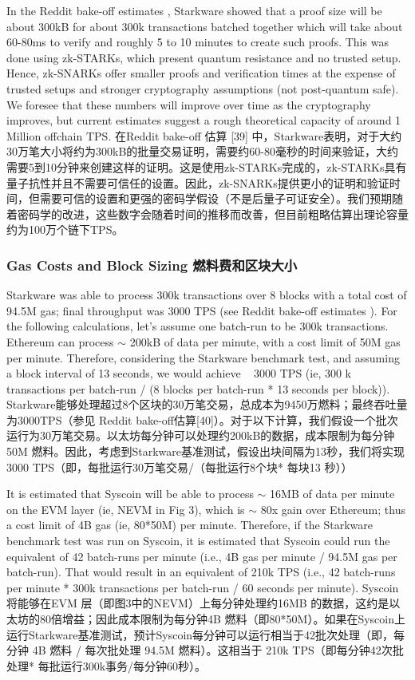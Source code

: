 \documentclass{ctexart}
\begin{document}
In the Reddit bake-off estimates \cite{Sta20a}, Starkware showed that a proof size will be about 300kB for about 300k transactions batched together which will take about 60-80ms to verify and roughly 5 to 10 minutes to create such proofs. This was done using zk-STARKs, which present quantum resistance and no trusted setup.  Hence, zk-SNARKs offer smaller proofs and verification times at the expense of trusted setups and stronger cryptography assumptions (not post-quantum safe). We foresee that these numbers will improve over time as the cryptography improves, but current estimates suggest a rough theoretical capacity of around 1 Million offchain TPS. 在Reddit bake-off 估算 [39] 中，Starkware表明，对于大约30万笔大小将约为300kB的批量交易证明，需要约60-80毫秒的时间来验证，大约需要5到10分钟来创建这样的证明。这是使用zk-STARKs完成的，zk-STARKs具有量子抗性并且不需要可信任的设置。因此，zk-SNARKs提供更小的证明和验证时间，但需要可信的设置和更强的密码学假设（不是后量子可证安全）。我们预期随着密码学的改进，这些数字会随着时间的推移而改善，但目前粗略估算出理论容量约为100万个链下TPS。

\subsubsection{Gas Costs and Block Sizing 燃料费和区块大小}

Starkware was able to process 300k transactions over 8 blocks with a total cost of 94.5M gas; final throughput was 3000 TPS (see Reddit bake-off estimates \cite{Sta20b}). For the following calculations, let’s assume one batch-run to be 300k transactions. Ethereum can process $\sim$ 200kB of data per minute, with a cost limit of 50M gas per minute. Therefore, considering the Starkware benchmark test, and assuming a block interval of 13 seconds, we would achieve ~ 3000 TPS (ie,  300 k transactions per batch-run / (8 blocks per batch-run * 13 seconds per block)). Starkware能够处理超过8个区块的30万笔交易，总成本为9450万燃料；最终吞吐量为3000TPS（参见 Reddit bake-off估算[40]）。对于以下计算，我们假设一个批次运行为30万笔交易。以太坊每分钟可以处理约200kB的数据，成本限制为每分钟50M 燃料。因此，考虑到Starkware基准测试，假设出块间隔为13秒，我们将实现3000 TPS（即，每批运行30万笔交易/（每批运行8个块* 每块13 秒））

It is estimated that Syscoin will be able to process $\sim$ 16MB of data per minute on the EVM layer (ie, NEVM in Fig 3), which is $\sim$ 80x gain over Ethereum; thus a cost limit of 4B gas (ie, 80*50M) per minute. Therefore, if the Starkware benchmark test was run on Syscoin, it is estimated that Syscoin could run the equivalent of 42 batch-runs per minute (i.e., 4B gas per minute / 94.5M gas per batch-run). That would result in an equivalent of 210k TPS (i.e., 42 batch-runs per minute * 300k transactions per batch-run / 60 seconds per minute). Syscoin将能够在EVM 层（即图3中的NEVM）上每分钟处理约16MB 的数据，这约是以太坊的80倍增益；因此成本限制为每分钟4B 燃料（即80*50M）。如果在Syscoin上运行Starkware基准测试，预计Syscoin每分钟可以运行相当于42批次处理（即，每分钟 4B 燃料 / 每次批处理 94.5M 燃料）。这相当于 210k TPS（即每分钟42次批处理* 每批运行300k事务/每分钟60秒）。
\end{document}
